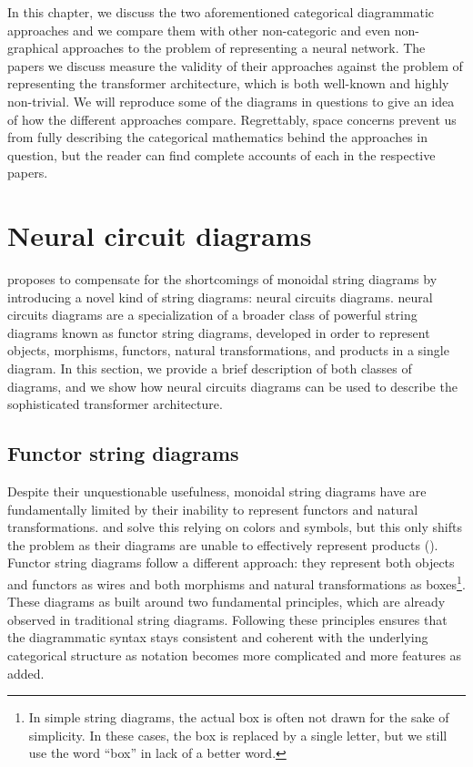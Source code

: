 \documentclass[11pt,a4paper,openright,twoside]{report}
\theoremstyle{plain}
\theoremstyle{definition}
\newcommand\dblquote[1]{\textquotedblleft #1\textquotedblright}
\begin{document}
In this chapter, we discuss the two aforementioned categorical diagrammatic approaches and we compare them with other non-categoric and even non-graphical approaches to the problem of representing a neural network. The papers we discuss measure the validity of their approaches against the problem of representing the transformer architecture, which is both well-known and highly non-trivial. We will reproduce some of the diagrams in questions to give an idea of how the different approaches compare. Regrettably, space concerns prevent us from fully describing the categorical mathematics behind the approaches in question, but the reader can find complete accounts of each in the respective papers.





\section{Neural circuit diagrams}

\cite{abbott2023robust} proposes to compensate for the shortcomings of monoidal string diagrams by introducing a novel kind of string diagrams: neural circuits diagrams. neural circuits diagrams are a specialization of a broader class of powerful string diagrams known as functor string diagrams, developed in order to represent objects, morphisms, functors, natural transformations, and products in a single diagram. In this section, we provide a brief description of both classes of diagrams, and we show how neural circuits diagrams can be used to describe the sophisticated transformer architecture.


\subsection{Functor string diagrams}

Despite their unquestionable usefulness, monoidal string diagrams have are fundamentally limited by their inability to represent functors and natural transformations. \cite{marsden2014category} and \cite{nakahira2023diagrammatic} solve this relying on colors and symbols, but this only shifts the problem as their diagrams are unable to effectively represent products (\cite{abbott2024functor}). Functor string diagrams follow a different approach: they represent both objects and functors as wires and both morphisms and natural transformations as boxes\footnote{In simple string diagrams, the actual box is often not drawn for the sake of simplicity. In these cases, the box is replaced by a single letter, but we still use the word \dblquote{box} in lack of a better word.}. These diagrams as built around two fundamental principles, which are already observed in traditional string diagrams. Following these principles ensures that the diagrammatic syntax stays consistent and coherent with the underlying categorical structure as notation becomes more complicated and more features as added. 
\end{document}

